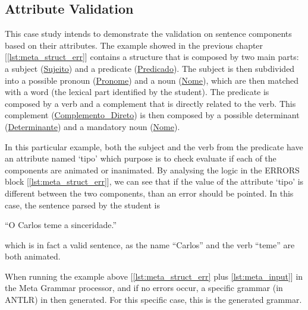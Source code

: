 \subsection{Attribute Validation}
This case study intends to demonstrate the validation on sentence components based on their attributes. The example showed in the previous chapter 
[\ref{lst:meta_struct_err}] contains a structure that is composed by two main parts: a subject (\underline{Sujeito}) and a predicate (\underline{Predicado}). 
The subject is then subdivided into a possible pronoun (\underline{Pronome}) and a noun (\underline{Nome}), which are then matched with a word 
(the lexical part identified by the student). The predicate is composed by a verb and a complement that is directly related to the verb. This complement 
(\underline{Complemento\_Direto}) is then composed by a possible determinant (\underline{Determinante}) and a mandatory noun (\underline{Nome}).

In this particular example, both the subject and the verb from the predicate have an attribute named ‘tipo’ which purpose is to check evaluate if each of the components
are animated or inanimated. By analysing the logic in the ERRORS block [\ref{lst:meta_struct_err}], we can see that if the value of the attribute ‘tipo’ is different 
between the two components, than an error should be pointed. In this case, the sentence parsed by the student is

``O Carlos teme a sinceridade.''

\noindent which is in fact a valid sentence, as the name ``Carlos'' and the verb ``teme'' are both animated.

When running the example above [\ref{lst:meta_struct_err} plus \ref{lst:meta_input}] in the Meta Grammar processor, and if no errors occur, a specific grammar (in ANTLR) 
in then generated. For this specific case, this is the generated grammar.

